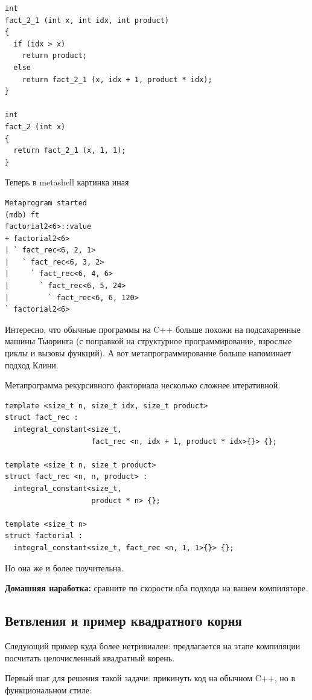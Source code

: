 \documentclass[a4paper,12pt,oneside]{book}
\begin{document}
\begin{lstlisting}
int
fact_2_1 (int x, int idx, int product)
{
  if (idx > x)
    return product;
  else
    return fact_2_1 (x, idx + 1, product * idx);
}

int
fact_2 (int x)
{
  return fact_2_1 (x, 1, 1);
}
\end{lstlisting}

Теперь в metashell картинка иная

\begin{verbatim}
Metaprogram started
(mdb) ft
factorial2<6>::value
+ factorial2<6> 
| ` fact_rec<6, 2, 1> 
|   ` fact_rec<6, 3, 2> 
|     ` fact_rec<6, 4, 6> 
|       ` fact_rec<6, 5, 24> 
|         ` fact_rec<6, 6, 120> 
` factorial2<6> 
\end{verbatim}

Интересно, что обычные программы на C++ больше похожи на подсахаренные машины Тьюринга (с поправкой на структурное программирование, взрослые циклы и вызовы функций). А вот метапрограммирование больше напоминает подход Клини.

Метапрограмма рекурсивного факториала несколько сложнее итеративной.

\begin{lstlisting}
template <size_t n, size_t idx, size_t product> 
struct fact_rec : 
  integral_constant<size_t, 
                    fact_rec <n, idx + 1, product * idx>{}> {};

template <size_t n, size_t product> 
struct fact_rec <n, n, product> : 
  integral_constant<size_t, 
                    product * n> {};

template <size_t n> 
struct factorial : 
  integral_constant<size_t, fact_rec <n, 1, 1>{}> {};
\end{lstlisting}

Но она же и более поучительна.

\textbf{Домашняя наработка:} сравните по скорости оба подхода на вашем компиляторе.

\subsection{Ветвления и пример квадратного корня}\label{TemplateIfElse}

Следующий пример куда более нетривиален: предлагается на этапе компиляции посчитать целочисленный квадратный корень.

Первый шаг для решения такой задачи: прикинуть код на обычном C++, но в функциональном стиле:
\end{document}
